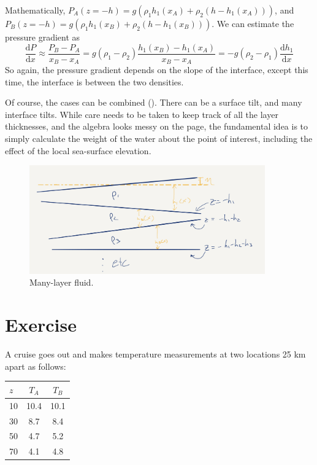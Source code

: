 Mathematically, $P_{A}(z=-h) = g(\rho_{1} h_{1}(x_{A}) + \rho_{2} (h-h_{1}(x_{A})))$, and
$P_{B}(z=-h) = g(\rho_{1} h_{1}(x_{B}) + \rho_{2} (h-h_{1}(x_{B})))$.  We can estimate the pressure gradient as
\begin{equation}
\frac{\mathrm{d}P}{\mathrm{d}x} \approx \frac{P_{B}-P_{A}}{x_{B}-x_{A}} = g(\rho_{1}-\rho_{2})\frac{h_{1}(x_{B})-h_{1}(x_{A})}{x_{B}-x_{A}} = -g(\rho_{2}-\rho_{1})\frac{\mathrm{d}h_1}{\mathrm{d}x}
\end{equation}
So again, the pressure gradient depends on the slope of the interface, except this time, the interface is between the two densities.

Of course, the cases can be combined ().  There can be a surface tilt, and many interface tilts.  While care needs to be taken to keep track of all the layer thicknesses, and the algebra looks messy on the page, the fundamental idea is to simply calculate the weight of the water about the point of interest, including the effect of the local sea-surface elevation.

\begin{figure}[htbp]
\begin{center}
\includegraphics[width=4in]{figs/MultipleLayers.png}
\caption{Many-layer fluid.}
\label{fig:MultipleLayers}
\end{center}
\end{figure}

\clearpage
\section{Exercise}

A cruise goes out and makes temperature measurements at two locations 25 km apart as follows:

  \begin{tabular}{l|cc}
    $z$& $T_A$& $T_B$\\
    \hline
    10 & 10.4& 10.1 \\
    30 & 8.7 & 8.4\\
    50 & 4.7 & 5.2\\
    70 & 4.1 & 4.8\\
  \end{tabular}

